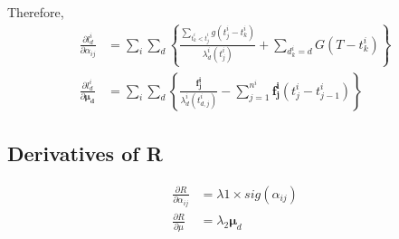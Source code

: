 \documentclass{article}
\begin{document}
			\newpage
			Therefore,
			\begin{equation}
			\begin{aligned}
			\frac{\partial l^i_d}{\partial\alpha_{ij}} &= \sum_{i} \sum_{d} \left\{\frac{\sum_{t_{k}^{i}<t_{j}^{i}} g\left(t_{j}^{i}-t_{k}^{i}\right)}{\lambda_{d}^{i}\left(t_{j}^{i}\right)} + \sum_{d^i_k = d}G\left(T - t^i_k\right) \right\} \\
			\frac{\partial l^i_d}{\partial\boldsymbol{\mu_d}} &=\sum_{i} \sum_{d}\left\{\frac{\boldsymbol{f^i_j}}{\lambda^i_d(t^i_{d,j})  }- \sum_{j=1}^{n^i} \boldsymbol{f^i_j }\left(t^i_j - t^i_{j-1}\right)  \right\}
			\end{aligned}
			\end{equation}
		
		\subsection{Derivatives of R}
			
			\begin{equation}
				\begin{aligned}
					\frac{\partial R}{\partial \alpha_{ij}} &= \lambda 1 \times sig\left(\alpha_{ij}\right) \\
					\frac{\partial R}{\partial \mu} &= \lambda_{2} \boldsymbol{\mu}_d
				\end{aligned}
			\end{equation}
			
		
\end{document}
